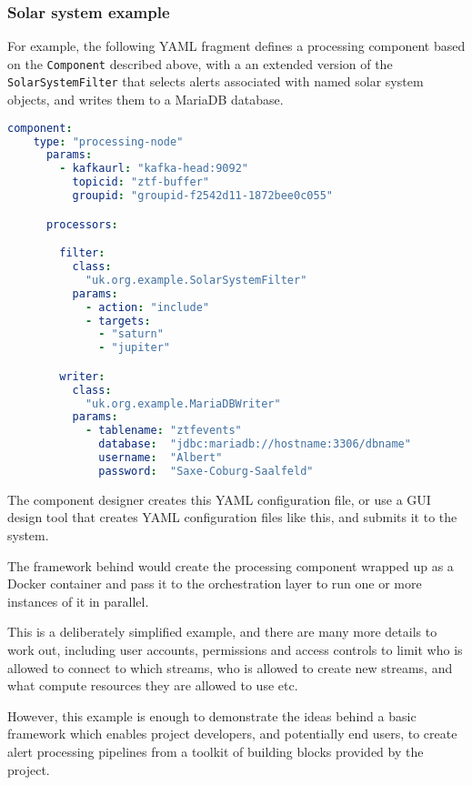 \documentclass{article}
\newcommand{\yaml} {YAML\xspace}
\newcommand{\docker} {Docker\xspace}
\newcommand{\mariadb} {MariaDB\xspace}
\begin{document}
\subsubsection{Solar system example}
\label{workflow.solar-system}

For example, the following \yaml fragment defines a processing component based on the \texttt{Component} described above, with a an extended version of the \texttt{SolarSystemFilter} that selects alerts associated with named solar system objects, and writes them to a \mariadb database.

\begin{lstlisting}[language=yaml]
  component:
    type: "processing-node"
      params:
        - kafkaurl: "kafka-head:9092"
          topicid: "ztf-buffer"
          groupid: "groupid-f2542d11-1872bee0c055"

      processors:

        filter:
          class:
            "uk.org.example.SolarSystemFilter"
          params:
            - action: "include"
            - targets:
              - "saturn"
              - "jupiter"

        writer:
          class:
            "uk.org.example.MariaDBWriter"
          params:
            - tablename: "ztfevents"
              database:  "jdbc:mariadb://hostname:3306/dbname"
              username:  "Albert"
              password:  "Saxe-Coburg-Saalfeld"
\end{lstlisting}

The component designer creates this \yaml configuration file, or use a GUI design tool that creates \yaml configuration files like this, and submits it to the system.

The framework behind would create the processing component wrapped up as a \docker container and pass it to the orchestration layer to run one or more instances of it in parallel.

This is a deliberately simplified example, and there are many more details to work out, including user accounts, permissions and access controls to limit who is allowed to connect to which streams, who is allowed to create new streams, and what compute resources they are allowed to use etc.

However, this example is enough to demonstrate the ideas behind a basic framework which enables project developers, and potentially end users, to create alert processing pipelines from a toolkit of building blocks provided by the project.
\end{document}

